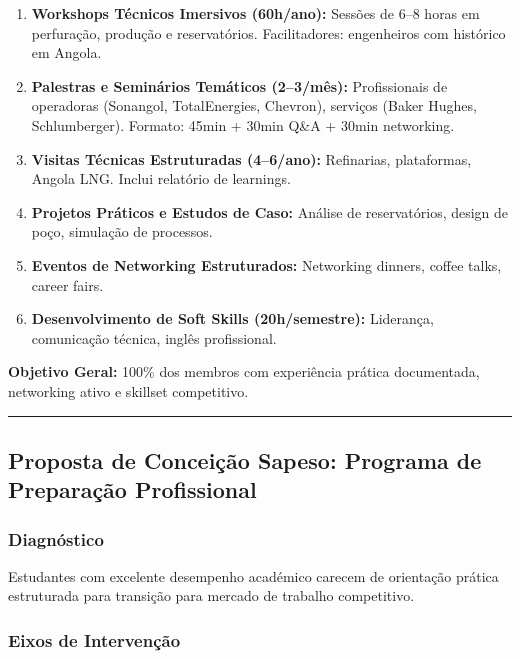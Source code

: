\documentclass[12pt,a4paper]{article}
\newcommand{\proposalsep}{%
  \vspace{6pt}%
  {\color{gold}\rule{0.35\linewidth}{0.7pt}}%
  \vspace{4pt}%
}
\begin{document}
\begin{enumerate}
    \item \textbf{Workshops Técnicos Imersivos (60h/ano):} Sessões de 6–8 horas em perfuração, produção e reservatórios. Facilitadores: engenheiros com histórico em Angola.
    \item \textbf{Palestras e Seminários Temáticos (2–3/mês):} Profissionais de operadoras (Sonangol, TotalEnergies, Chevron), serviços (Baker Hughes, Schlumberger). Formato: 45min + 30min Q\&A + 30min networking.
    \item \textbf{Visitas Técnicas Estruturadas (4–6/ano):} Refinarias, plataformas, Angola LNG. Inclui relatório de learnings.
    \item \textbf{Projetos Práticos e Estudos de Caso:} Análise de reservatórios, design de poço, simulação de processos.
    \item \textbf{Eventos de Networking Estruturados:} Networking dinners, coffee talks, career fairs.
    \item \textbf{Desenvolvimento de Soft Skills (20h/semestre):} Liderança, comunicação técnica, inglês profissional.
\end{enumerate}

\begin{infobox}
\small\textbf{Objetivo Geral:} 100\% dos membros com experiência prática documentada, networking ativo e skillset competitivo.
\end{infobox}

\proposalsep

\subsection{Proposta de Conceição Sapeso: Programa de Preparação Profissional}

\subsubsection*{Diagnóstico}
Estudantes com excelente desempenho académico carecem de orientação prática estruturada para transição para mercado de trabalho competitivo.

\subsubsection*{Eixos de Intervenção}
\end{document}
